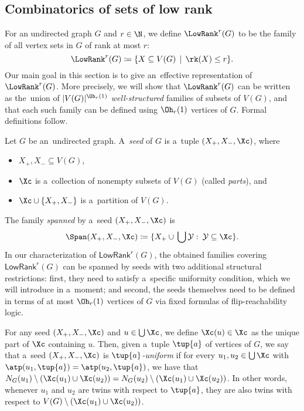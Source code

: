 
\subsection{Combinatorics of sets of low rank}
\label{sec:low-rank-comb}

For an undirected graph $G$ and $r \in \N$, we define $\LowRank^r(G)$ to be the family of all vertex sets in $G$ of rank at most $r$:
\[
    \LowRank^r(G) \coloneqq \{ X \subseteq V(G) \,\mid\, \rk(X) \leq r \}.
\]
Our main goal in this section is to give an~effective representation of $\LowRank^r(G)$.
More precisely, we will show that $\LowRank^r(G)$ can be written as the~union of $|V(G)|^{\Oh_r(1)}$ \emph{well-structured} families of subsets of $V(G)$, and that each such family can be defined using $\Oh_r(1)$ vertices of $G$.
Formal definitions follow.

Let $G$ be an~undirected graph.
A~\emph{seed} of $G$ is a~tuple $(X_+, X_-, \Xc)$, where
\begin{itemize}[nosep]
 \item $X_+, X_- \subseteq V(G)$,
 \item $\Xc$ is a~collection of nonempty subsets of $V(G)$ (called {\em{parts}}), and
 \item $\Xc \cup \{X_+, X_-\}$ is a~partition of $V(G)$.
\end{itemize}
The family \emph{spanned} by a~seed $(X_+, X_-, \Xc)$ is
\[ \Span(X_+, X_-, \Xc) \coloneqq \{X_+ \cup \, \bigcup \mathcal{Y} \,\colon\, \mathcal{Y} \subseteq \Xc\}. \]
In our characterization of  $\mathsf{LowRank}^r(G)$, the obtained families covering  $\mathsf{LowRank}^r(G)$ can be spanned by seeds with two additional structural restrictions: first, they need to satisfy a~specific uniformity condition, which we will introduce in a~moment; and second, the seeds themselves need to be defined in terms of at most $\Oh_r(1)$ vertices of $G$ via fixed formulas of flip-reachability logic.

For any seed $(X_+, X_-, \Xc)$ and $u \in \bigcup \Xc$, we define $\Xc(u) \in \Xc$ as the unique part of $\Xc$ containing $u$.
Then, given a~tuple $\tup{a}$ of vertices of $G$, we say that a~seed $(X_+, X_-, \Xc)$ is \emph{$\tup{a}$-uniform} if for every $u_1, u_2 \in \bigcup \Xc$ with $\atp(u_1, \tup{a}) = \atp(u_2, \tup{a})$, we have that $N_G(u_1) \setminus (\Xc(u_1) \cup \Xc(u_2)) = N_G(u_2) \setminus (\Xc(u_1) \cup \Xc(u_2))$.
In other words, whenever $u_1$ and $u_2$ are twins with respect to $\tup{a}$, they are also twins with respect to $V(G) \setminus (\Xc(u_1) \cup \Xc(u_2))$.

